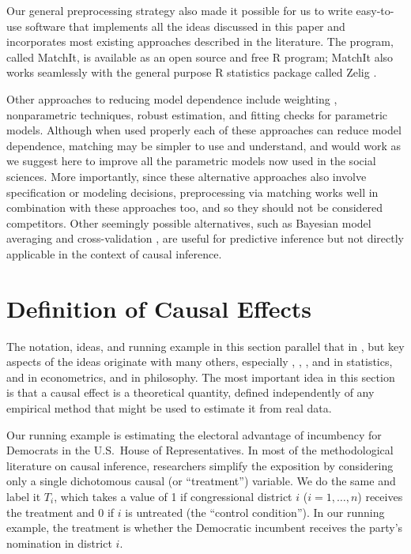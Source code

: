 \documentclass[11pt,titlepage]{article}
\begin{document}
Our general preprocessing strategy also made it possible for us to
write easy-to-use software that implements all the ideas discussed in
this paper and incorporates most existing approaches described in the
literature.  The program, called MatchIt, is available as an open
source and free R program; MatchIt also works seamlessly with the
general purpose R statistics package called Zelig \citep{ImaKinLau06}.

Other approaches to reducing model dependence include weighting
\citep{RobRot03, HirImbRid03}, nonparametric techniques, robust
estimation, and fitting checks for parametric models.  Although when
used properly each of these approaches can reduce model dependence,
matching may be simpler to use and understand, and would work as we
suggest here to improve all the parametric models now used in the
social sciences.  More importantly, since these alternative approaches
also involve specification or modeling decisions, preprocessing via
matching works well in combination with these approaches too, and so
they should not be considered competitors.  Other seemingly possible
alternatives, such as Bayesian model averaging
\citep{HoeMadRaf99,ImaKin04} and cross-validation \citep{BlaSmi04},
are useful for predictive inference but not directly applicable in the
context of causal inference.

\section{Definition of Causal Effects}

The notation, ideas, and running example in this section parallel that
in \citet[][Section 3.1.1]{KinKeoVer94}, but key aspects of the ideas
originate with many others, especially \citet{Neyman23b},
\citet{Fisher35}, \citet{Cox58}, \citet{Rubin74} and \citet{Holland86}
in statistics, \citet{Roy51} and \citet{Quandt72} in econometrics, and
\citet{Lewis73} in philosophy.  The most important idea in this
section is that a causal effect is a theoretical quantity, defined
independently of any empirical method that might be used to estimate
it from real data.

Our running example is estimating the electoral advantage of
incumbency for Democrats in the U.S.\ House of Representatives.  In
most of the methodological literature on causal inference, researchers
simplify the exposition by considering only a single dichotomous
causal (or ``treatment'') variable.  We do the same and label it
$T_i$, which takes a value of 1 if congressional district $i$
($i=1,\dots,n$) receives the treatment and 0 if $i$ is untreated (the
``control condition'').  In our running example, the treatment is
whether the Democratic incumbent receives the party's nomination in
district $i$.
\end{document}
